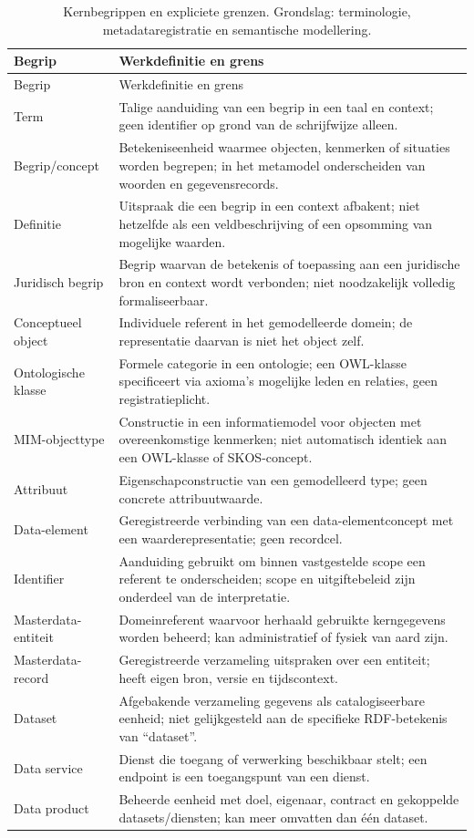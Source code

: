 \begin{longtable}{@{}P{.23\linewidth}P{.70\linewidth}@{}}
\caption{Kernbegrippen en expliciete grenzen. Grondslag: terminologie, metadata\-registratie en semantische modellering. \citep{S11,S08,S13,S28,S30,S31,S47,L12}}\label{tab:concepts}\\
\toprule Begrip & Werkdefinitie en grens \\ \midrule\endfirsthead
\toprule Begrip & Werkdefinitie en grens \\ \midrule\endhead
Term & Talige aanduiding van een begrip in een taal en context; geen identifier op grond van de schrijfwijze alleen. \\
Begrip/concept & Betekeniseenheid waarmee objecten, kenmerken of situaties worden begrepen; in het metamodel onderscheiden van woorden en gegevensrecords. \\
Definitie & Uitspraak die een begrip in een context afbakent; niet hetzelfde als een veldbeschrijving of een opsomming van mogelijke waarden. \\
Juridisch begrip & Begrip waarvan de betekenis of toepassing aan een juridische bron en context wordt verbonden; niet noodzakelijk volledig formaliseerbaar. \\
Conceptueel object & Individuele referent in het gemodelleerde domein; de representatie daarvan is niet het object zelf. \\
Ontologische klasse & Formele categorie in een ontologie; een OWL-klasse specificeert via axioma’s mogelijke leden en relaties, geen registratieplicht. \\
MIM-objecttype & Constructie in een informatiemodel voor objecten met overeenkomstige kenmerken; niet automatisch identiek aan een OWL-klasse of SKOS-concept. \\
Attribuut & Eigenschapconstructie van een gemodelleerd type; geen concrete attribuutwaarde. \\
Data-element & Geregistreerde verbinding van een data-elementconcept met een waarderepresentatie; geen recordcel. \\
Identifier & Aanduiding gebruikt om binnen vastgestelde scope een referent te onderscheiden; scope en uitgiftebeleid zijn onderdeel van de interpretatie. \\
Masterdata-entiteit & Domeinreferent waarvoor herhaald gebruikte kerngegevens worden beheerd; kan administratief of fysiek van aard zijn. \\
Masterdata-record & Geregistreerde verzameling uitspraken over een entiteit; heeft eigen bron, versie en tijdscontext. \\
Dataset & Afgebakende verzameling gegevens als catalogiseerbare eenheid; niet gelijkgesteld aan de specifieke RDF-betekenis van ``dataset''. \\
Data service & Dienst die toegang of verwerking beschikbaar stelt; een endpoint is een toegangspunt van een dienst. \\
Data product & Beheerde eenheid met doel, eigenaar, contract en gekoppelde datasets/diensten; kan meer omvatten dan één dataset. \\
\bottomrule
\end{longtable}

